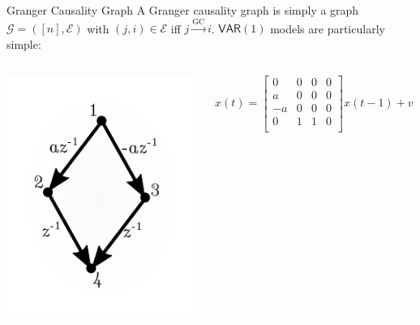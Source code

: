 \documentclass{beamer} %
\def\gc{\overset{\text{GC}}{\rightarrow}}  %
\def\gcg{\mathcal{G}}  %
\def\gcge{\mathcal{E}}  %
\def\VAR{\mathsf{VAR}}  %
\begin{document}
\begin{frame}{Granger Causality Graph}
  A Granger causality graph is simply a graph $\gcg = ([n], \gcge)$
  with $(j, i) \in \gcge$ iff $j \gc i$.  $\VAR(1)$ models are
  particularly simple:

  \begin{columns}
    \begin{column}{0.25\textwidth}
      \includegraphics[width=1.5\linewidth]{../../figures/example1.pdf}
    \end{column}

    \begin{column}{0.75\textwidth}
      \begin{equation*}
        x(t) = \left[
          \begin{array}{cccc}
            0 & 0 & 0 & 0\\
            a & 0 & 0 & 0\\
            -a & 0 & 0 & 0\\
            0 & 1 & 1 & 0\\
          \end{array}\right]
        x(t - 1) + v(t)
      \end{equation*}
    \end{column}
  \end{columns}
\end{frame}
\end{document}

